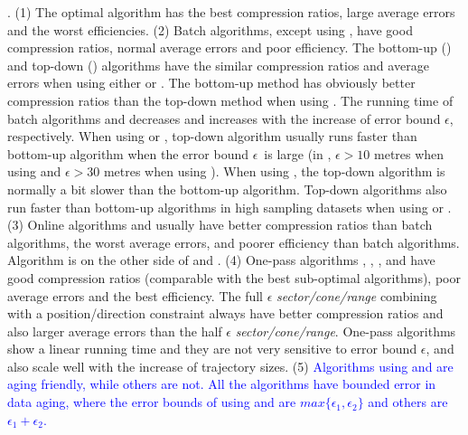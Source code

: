 .
(1) The optimal algorithm has the best compression ratios, large average errors and the worst efficiencies.
%
(2) Batch algorithms, except \dpa using \dad, have good compression ratios, normal average errors and poor efficiency.
%
The bottom-up (\tpa) and top-down (\dpa) algorithms have the similar compression ratios and average errors when using either \ped or \sed. The bottom-up method has obviously better compression ratios than the top-down method when using \dad.
%
The running time of batch algorithms \dpa and \tpa decreases and increases with the increase of error bound $\epsilon$, respectively. When using \ped or \sed, top-down algorithm \dpa usually runs faster than bottom-up algorithm \tpa when the error bound $\epsilon$~is large  (\eg in \geolife, $\epsilon >10$ metres when using \ped and $\epsilon >30$ metres when using \sed). When using \dad, the top-down algorithm is normally a bit slower than the bottom-up algorithm.
Top-down algorithms also run faster than bottom-up algorithms in high sampling datasets when using \ped or \sed.
%
(3) Online algorithms \opwa and \bqsa usually have better compression ratios than batch algorithms, the worst average errors, and poorer efficiency than batch algorithms. Algorithm \squishe is on the other side of \opwa and \bqsa.
%
(4) One-pass algorithms \operb, \siped, \cised, \intersec and \interval have good compression ratios (comparable with the best sub-optimal algorithms), poor average errors and the best efficiency.
%
The full $\epsilon$ \emph{sector/cone/range} combining with a position/direction constraint always have better compression ratios and also larger average errors than the half $\epsilon$ \emph{sector/cone/range}. %
%
One-pass algorithms show a linear running time and they are not very sensitive to error bound $\epsilon$, and also scale well with the increase of trajectory sizes.
%
(5) \textcolor{blue}{Algorithms \dpa using \ped and \sed are aging friendly, while others are not. All the algorithms have bounded error in data aging, where the error bounds of \dpa using \ped and \sed are $max\{\epsilon_1, \epsilon_2\}$ and others are $\epsilon_1 + \epsilon_2$.}


